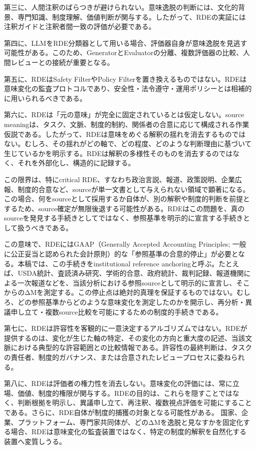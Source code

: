 \documentclass[
  a4paper]{ltjsarticle}
\begin{document}
第三に、人間注釈のばらつきが避けられない。意味逸脱の判断には、文化的背景、専門知識、制度理解、価値判断が関与する。したがって、RDEの実証には注釈ガイドと注釈者間一致の評価が必要である。

第四に、LLMをRDE分類器として用いる場合、評価器自身が意味逸脱を見逃す可能性がある。このため、GeneratorとEvaluatorの分離、複数評価器の比較、人間レビューとの接続が重要となる。

第五に、RDEはSafety FilterやPolicy
Filterを置き換えるものではない。RDEは意味変化の監査プロトコルであり、安全性・法令遵守・運用ポリシーとは相補的に用いられるべきである。

第六に、RDEは「元の意味」が完全に固定されているとは仮定しない。source
meaningは、タスク、文脈、制度的制約、関係者の合意に応じて構成される作業仮説である。したがって、RDEは意味をめぐる解釈の揺れを消去するものではない。むしろ、その揺れがどの軸で、どの程度、どのような判断理由に基づいて生じているかを明示する。RDEは解釈の多様性そのものを消去するのではなく、それを外部化し、構造的に記録する。

この限界は、特にcritical
RDE、すなわち政治言説、報道、政策説明、企業広報、制度的合意など、sourceが単一文書として与えられない領域で顕著になる。この場合、何をsourceとして採用するか自体が、別の解釈や制度的判断を前提とするため、source確定が無限後退する可能性がある。RDEはこの問題を、真のsourceを発見する手続きとしてではなく、参照基準を明示的に宣言する手続きとして扱うべきである。

この意味で、RDEにはGAAP（Generally Accepted Accounting Principles;
一般に公正妥当と認められた会計原則）的な「参照基準の合意的停止」が必要となる。本稿では、この手続きをinstitutional reference anchoringと呼ぶ。たとえば、USDA統計、査読済み研究、学術的合意、政府統計、裁判記録、報道機関による一次報道などを、当該分析における参照sourceとして明示的に宣言し、そこからのΔMを測定する。この停止点は絶対的真理を保証するものではない。むしろ、どの参照基準からどのような意味変化を測定したのかを開示し、再分析・異議申し立て・複数source比較を可能にするための制度的手続きである。

第七に、RDEは許容性を客観的に一意決定するアルゴリズムではない。RDEが提供するのは、変化が生じた軸の特定、その変化の方向と重大度の記述、当該文脈における典型的な許容範囲との比較情報である。許容性の最終判断は、タスクの責任者、制度的ガバナンス、または合意されたレビュープロセスに委ねられる。

第八に、RDEは評価者の権力性を消去しない。意味変化の評価には、常に立場、価値、制度的権限が関与する。RDEの目的は、これらを隠すことではなく、判断根拠を明示し、異議申し立て、再注釈、複数視点評価を可能にすることである。さらに、RDE自体が制度的捕獲の対象となる可能性がある。 国家、企業、プラットフォーム、専門家共同体が、どのΔMを逸脱と見なすかを固定化する場合、RDEは意味変化の監査装置ではなく、特定の制度的解釈を自然化する装置へ変質しうる。
\end{document}
